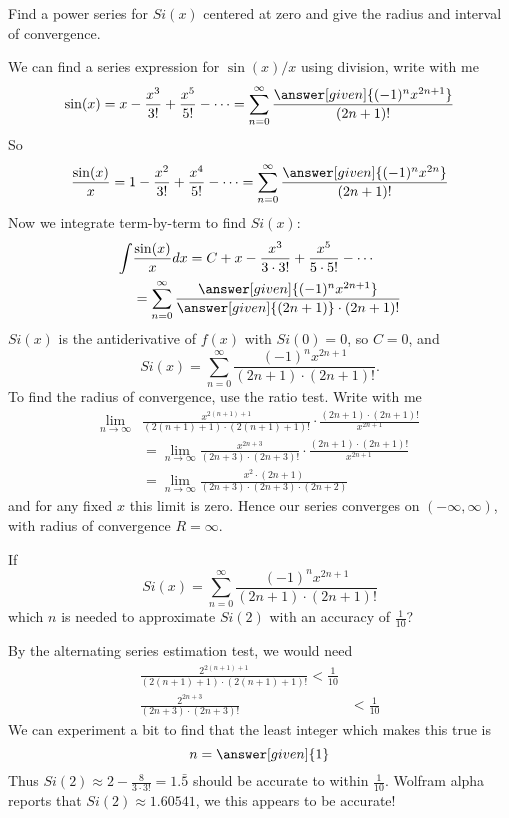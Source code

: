 \documentclass{ximera}
\begin{document}
\begin{example}
  Find a power series for $Si(x)$ centered at zero and give the
  radius and interval of convergence.
\begin{explanation}
  We can find a series expression for $\sin(x)/x$ using division, write with me
  \[
  \sin(x) = x-\frac{x^3}{3!}+\frac{x^5}{5!}-\dots = \sum_{n=0}^\infty \frac{\answer[given]{(-1)^n x^{2n+1}}}{(2n+1)!} 
  \]
  So 
  \[
  \frac{\sin(x)}{x} =1-\frac{x^2}{3!}+\frac{x^4}{5!}-\dots = \sum_{n=0}^\infty \frac{\answer[given]{(-1)^n x^{2n}}}{(2n+1)!} 
  \]
  Now we integrate term-by-term to find $Si(x)$:
  \begin{align*}
  \int &\frac{\sin(x)}{x} dx = C+x-\frac{x^3}{3 \cdot 3!}+\frac{x^5}{5 \cdot 5!}-\cdots \\
  &= \sum_{n=0}^\infty \frac{\answer[given]{(-1)^nx^{2n+1}}}{\answer[given]{(2n+1)} \cdot (2n+1)!} 
  \end{align*}
  $Si(x)$ is the antiderivative of $f(x)$ with $Si(0) = 0$, so  $C=0$, and 
  \[
  Si(x) = \sum_{n=0}^\infty \frac{(-1)^nx^{2n+1}}{(2n+1) \cdot (2n+1)!}.
  \]
  To find the radius of convergence, use the ratio test. Write with me
  \begin{align*}
    \lim_{n\to\infty} &\frac{x^{2(n+1)+1}}{(2(n+1)+1) \cdot (2(n+1)+1)!} \cdot \frac{(2n+1) \cdot (2n+1)!}{x^{2n+1}}\\
    &=\lim_{n\to\infty}\frac{x^{2n+3}}{(2n+3) \cdot (2n+3)!} \cdot \frac{(2n+1) \cdot (2n+1)!}{x^{2n+1}}\\
    &=\lim_{n\to\infty}\frac{x^{2}\cdot (2n+1)}{(2n+3) \cdot (2n+3)\cdot(2n+2)}
  \end{align*}
  and for any fixed $x$ this limit is zero. Hence our series converges
  on $(-\infty,\infty)$, with radius of convergence $R=\infty$.
 \end{explanation}
\end{example}


\begin{example}
  If
  \[
  Si(x) = \sum_{n=0}^\infty \frac{(-1)^n x^{2n+1}}{(2n+1) \cdot (2n+1)!} 
  \]
  which $n$ is needed to approximate $Si(2)$ with an accuracy
  of $\frac{1}{10}$?
  \begin{explanation}
    By the alternating series estimation test, we would need
    \begin{align*}
    \frac{2^{2(n+1)+1}}{(2(n+1)+1) \cdot (2(n+1)+1)!}  <  \frac{1}{10}\\
    \frac{ 2^{2n+3}}{(2n+3) \cdot (2n+3)!} &< \frac{1}{10}
    \end{align*}
    We can experiment a bit to find that the least integer which makes this true is 
    \[
    n= \answer[given]{1}
    \]
    Thus $Si(2) \approx 2-\frac{8}{3 \cdot 3!} = 1.\bar{5}$ should be
    accurate to within $\frac{1}{10}$.  Wolfram alpha reports that $Si(2)
    \approx 1.60541 $, we this appears to be accurate!
  \end{explanation}
\end{example}
\end{document}
